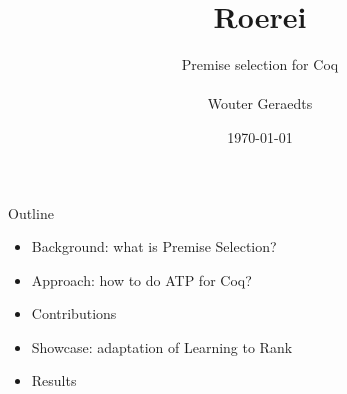 \documentclass[department=ds, notes={hide notes}, slidesperpage=1]{beamerruhuisstijl}
\title{Roerei}
\subtitle{
	Premise selection for Coq\\
	\\
	Wouter Geraedts
}
\date{\today}
\begin{document}
\renewcommand{\dept}{icis}



\newsavebox\mytempbib
\savebox{}

\begin{frame}
	\titlepage
\end{frame}

\begin{frame}{Outline}
	\begin{itemize}
		\item Background: what is Premise Selection?
		\item Approach: how to do ATP for Coq?
		\item Contributions
		\item Showcase: adaptation of Learning to Rank
		\item Results
	\end{itemize}
\end{frame}
\end{document}
